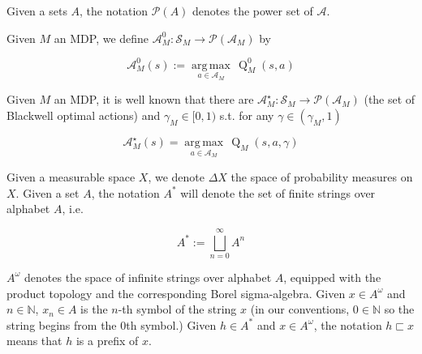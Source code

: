 \documentclass[anon,12pt]{colt2018} %
\newcommand{\Comment}[1]{}
\newcommand{\AP}[1]{\left(#1\right)}
\newcommand{\PS}[1]{\mathcal{P}\AP{#1}}
\newcommand{\Argmax}[1]{\underset{#1}{\operatorname{arg\,max}}\,}
\newcommand{\Nats}{\mathbb{N}}
\newcommand{\A}{\mathcal{A}}
\newcommand{\St}{\mathcal{S}}
\newcommand{\Q}{\operatorname{Q}}
\begin{document}
Given a sets $A$, the notation $\PS{A}$ denotes the power set of $\A$.

\begin{samepage}
\begin{definition}

Given $M$ an MDP, we define $\A_M^0: \St_M \rightarrow \PS{\A_M}$ by

\begin{equation}
\A_M^0(s) := \Argmax{a \in \A_M} \Q_M^0(s,a)
\end{equation}

\Comment{That is, $\A_M^0(s)$ is the set of actions at state $s$ that don't enter traps (i.e. destroy value in the long run.)}

\end{definition}
\end{samepage}

\begin{samepage}
\begin{definition}

Given $M$ an MDP, it is well known that there are $\A_M^\star: \St_M \rightarrow \PS{\A_M}$ (the set of Blackwell optimal actions) and $\gamma_M\in[0,1)$ s.t. for any $\gamma\in\AP{\gamma_M,1}$

\begin{equation}
\A_M^\star(s) = \Argmax{a \in \A_M} \Q_M\AP{s,a,\gamma}
\end{equation}

\Comment{Thus, $\A_M^\star(s)$ is the set of actions that are optimal at state $s$, assuming that we plan for sufficiently long term.}

\end{definition}
\end{samepage}

Given a measurable space $X$, we denote $\Delta X$ the space of probability measures on $X$. 
Given a set $A$, the notation $A^*$ will denote the set of finite strings over alphabet $A$, i.e.

\[A^* := \bigsqcup_{n = 0}^\infty A^n\]

$A^\omega$ denotes the space of infinite strings over alphabet $A$, equipped with the product topology and the corresponding Borel sigma-algebra. Given $x\in A^\omega$ and $n \in \Nats$, $x_n \in A$ is the $n$-th symbol of the string $x$ (in our conventions, $0 \in \Nats$ so the string begins from the 0th symbol.) Given $h \in A^*$ and $x \in A^\omega$, the notation $h \sqsubset x$ means that $h$ is a prefix of $x$.
\end{document}
